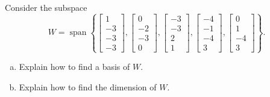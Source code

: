 
\begin{exerciseStatement}


Consider the subspace \[W=\operatorname{span}  \left\{ \left[\begin{array}{c}
1 \\
-3 \\
-3 \\
-3
\end{array}\right] , \left[\begin{array}{c}
0 \\
-2 \\
-3 \\
0
\end{array}\right] , \left[\begin{array}{c}
-3 \\
-3 \\
2 \\
1
\end{array}\right] , \left[\begin{array}{c}
-4 \\
-1 \\
-4 \\
3
\end{array}\right] , \left[\begin{array}{c}
0 \\
1 \\
-4 \\
3
\end{array}\right] \right\} .\]


\begin{enumerate}[(a)]
\item  Explain how to find a basis of \(W\).
\item  Explain how to find the dimension of \(W\).
\end{enumerate}
    
\end{exerciseStatement}
    
